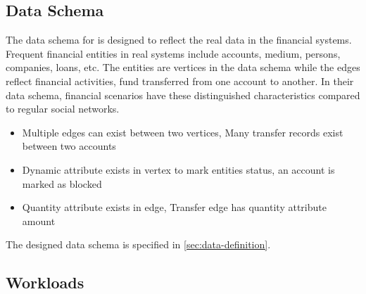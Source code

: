 \subsection{Data Schema}

The data schema for \ldbcfinbench is designed to reflect the real data in the financial systems. Frequent
financial entities in real systems include accounts, medium, persons, companies, loans, etc. The
entities are vertices in the data schema while the edges reflect financial activities, \eg fund transferred
from one account to another. In their data schema, financial scenarios have these distinguished characteristics
compared to regular social networks.
\begin{itemize}
      \item Multiple edges can exist between two vertices, \eg Many transfer records exist between two accounts
      \item Dynamic attribute exists in vertex to mark entities status, \eg an account is marked as blocked
      \item Quantity attribute exists in edge, \eg Transfer edge has quantity attribute amount
\end{itemize}

The designed data schema is specified in \autoref{sec:data-definition}.

\subsection{Workloads}

